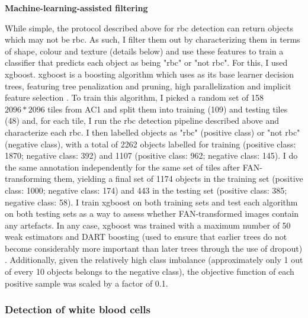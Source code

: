 \noindent \textbf{Machine-learning-assisted filtering}

While simple, the protocol described above for \ac{rbc} detection can return objects which may not be \ac{rbc}. As such, I filter them out by characterizing them in terms of shape, colour and texture (details below) and use these features to train a classifier that predicts each object as being "\ac{rbc}" or "not \ac{rbc}". For this, I used \ac{xgboost}. \ac{xgboost} is a boosting algorithm which uses as its base learner decision trees, featuring tree penalization and pruning, high parallelization and implicit feature selection \cite{Chen2016-xk}. To train this algorithm, I picked a random set of 158 $2096*2096$ tiles from AC1 and split them into training (109) and testing tiles (48) and, for each tile, I run the \ac{rbc} detection pipeline described above and characterize each \ac{rbc}. I then labelled objects as "\ac{rbc}" (positive class) or "not \ac{rbc}" (negative class), with a total of 2262 objects labelled for training (positive class: 1870; negative class: 392) and 1107 (positive class: 962; negative class: 145). I do the same annotation independently for the same set of tiles after FAN-transforming them, yielding a final set of 1174 objects in the training set (positive class: 1000; negative class: 174) and 443 in the testing set (positive class: 385; negative class: 58). I train \ac{xgboost} on both training sets and test each algorithm on both testing sets as a way to assess whether FAN-transformed images contain any artefacts. In any case, \ac{xgboost} was trained with a maximum number of 50 weak estimators and DART boosting (used to ensure that earlier trees do not become considerably more important than later trees through the use of dropout) \cite{Rashmi2015-qe}. Additionally, given the relatively high class imbalance (approximately only 1 out of every 10 objects belongs to the negative class), the objective function of each positive sample was scaled by a factor of 0.1.

\subsubsection{Detection of white blood cells}

